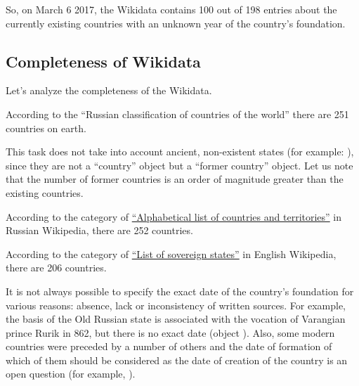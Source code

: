 
So, on March 6 2017, the Wikidata contains 100 out of 198 entries about the currently existing countries with an unknown year of the country's foundation.

\subsection{Completeness of Wikidata}

Let's analyze the completeness of the Wikidata.

According to the ``Russian classification of countries of the world'' there are 251 countries on earth.

This task does not take into account ancient, non-existent states (for example: ), since they are not a ``country'' object but a ``former country'' object. Let us note that the number of former countries is an order of magnitude greater than the existing countries.

According to the category of \href{https://w.wiki/dWv}{``Alphabetical list of countries and territories''} in Russian Wikipedia, there are 252 countries.

According to the category of \href{https://en.wikipedia.org/wiki/List_of_sovereign_states}{``List of sovereign states''} in English Wikipedia, there are 206 countries.

It is not always possible to specify the exact date of the country's foundation for various reasons: absence, lack or inconsistency of written sources. For example, the basis of the Old Russian state is associated with the vocation of Varangian prince Rurik in 862, but there is no exact date (object ). Also, some modern countries were preceded by a number of others and the date of formation of which of them should be considered as the date of creation of the country is an open question (for example, ).


